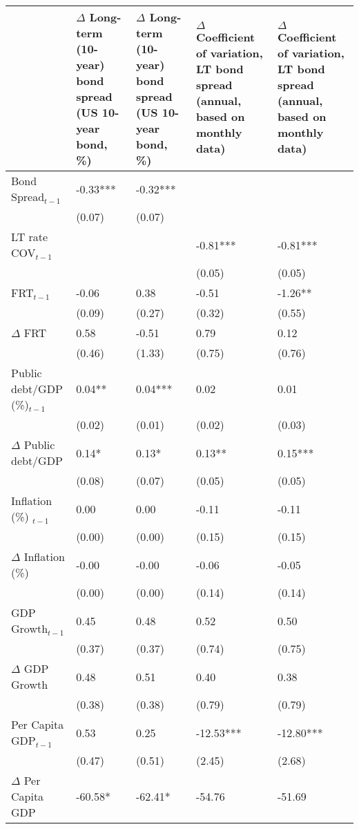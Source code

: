 {\tiny
\begin{tabular}{lp{3cm}p{3cm}p{3cm}p{3cm}}
  \hline
 & $\Delta$ Long-term (10-year) bond spread (US 10-year bond, \%) & $\Delta$ Long-term (10-year) bond spread (US 10-year bond, \%) & $\Delta$ Coefficient of variation, LT bond spread (annual, based on monthly data) & $\Delta$ Coefficient of variation, LT bond spread (annual, based on monthly data) \\ 
  \hline
Bond Spread$_{t-1}$ & -0.33*** & -0.32*** &  &  \\ 
   & (0.07) & (0.07) &  &  \\ 
  LT rate COV$_{t-1}$ &  &  & -0.81*** & -0.81*** \\ 
   &  &  & (0.05) & (0.05) \\ 
  FRT$_{t-1}$ & -0.06 & 0.38 & -0.51 & -1.26** \\ 
   & (0.09) & (0.27) & (0.32) & (0.55) \\ 
  $\Delta$ FRT & 0.58 & -0.51 & 0.79 & 0.12 \\ 
   & (0.46) & (1.33) & (0.75) & (0.76) \\ 
  Public debt/GDP (\%)$_{t-1}$ & 0.04** & 0.04*** & 0.02 & 0.01 \\ 
   & (0.02) & (0.01) & (0.02) & (0.03) \\ 
  $\Delta$ Public debt/GDP & 0.14* & 0.13* & 0.13** & 0.15*** \\ 
   & (0.08) & (0.07) & (0.05) & (0.05) \\ 
  Inflation (\%) $_{t-1}$ & 0.00 & 0.00 & -0.11 & -0.11 \\ 
   & (0.00) & (0.00) & (0.15) & (0.15) \\ 
  $\Delta$ Inflation (\%) & -0.00 & -0.00 & -0.06 & -0.05 \\ 
   & (0.00) & (0.00) & (0.14) & (0.14) \\ 
  GDP Growth$_{t-1}$ & 0.45 & 0.48 & 0.52 & 0.50 \\ 
   & (0.37) & (0.37) & (0.74) & (0.75) \\ 
  $\Delta$ GDP Growth & 0.48 & 0.51 & 0.40 & 0.38 \\ 
   & (0.38) & (0.38) & (0.79) & (0.79) \\ 
  Per Capita GDP$_{t-1}$ & 0.53 & 0.25 & -12.53*** & -12.80*** \\ 
   & (0.47) & (0.51) & (2.45) & (2.68) \\ 
  $\Delta$ Per Capita GDP & -60.58* & -62.41* & -54.76 & -51.69 \\ 

\end{tabular}}
